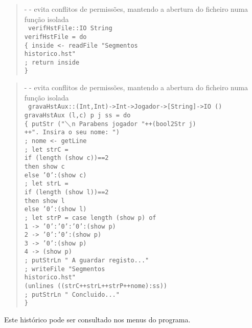\documentclass[a4paper,titlepage]{scrreprt}
\begin{document}
	\begin{quote}
		{\small - - evita conflitos de permissões, mantendo a abertura do ficheiro numa função isolada\\}
		{\tt
		verifHstFile::IO String\\
		verifHstFile = do\\
		\{ inside <- readFile "Segmentos\\historico.hst"\\
		; return inside\\
		\}
		}
	\end{quote}
	\begin{quote}
		{\small - - evita conflitos de permissões, mantendo a abertura do ficheiro numa função isolada\\}
		{\tt
		gravaHstAux::(Int,Int)->Int->Jogador->[String]->IO ()\\
		gravaHstAux (l,c) p j ss = do\\
		\{ putStr ("$\diagdown$n Parabens jogador "++(bool2Str j)\\
		++". Insira o seu nome: ")\\
		; nome <- getLine\\
		; let strC =\\
		if (length (show c))==2\\
		then show c\\
		else '0':(show c)\\
		; let strL =\\
		if (length (show l))==2\\
		then show l\\
		else '0':(show l)\\
		; let strP = case length (show p) of\\
		1 -> '0':'0':'0':(show p)\\
		2 -> '0':'0':(show p)\\
		3 -> '0':(show p)\\
		4 -> (show p)\\
		; putStrLn " A guardar registo..."\\
		; writeFile "Segmentos\\historico.hst"\\
		(unlines ((strC++strL++strP++nome):ss))\\
		; putStrLn " Concluido..."\\
		\}
		}
	\end{quote}
Este histórico pode ser consultado nos menus do programa.
\end{document}
